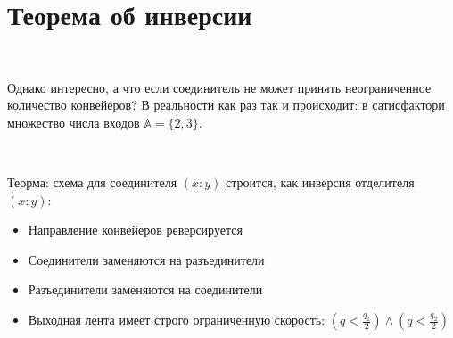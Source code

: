 \vspace{0.5in}

\section{Теорема об инверсии}

\

Однако интересно, а что если соединитель не может принять неограниченное количество конвейеров? В реальности как раз так и происходит: в сатисфактори множество числа входов $\mathbb{A} = \{ 2, 3 \}$. 

\

\noindent Теорма: схема для соединителя $(x:y)$ строится, как инверсия отделителя $(x:y)$:

\begin{itemize}
	\item Направление конвейеров реверсируется
	
	\item Соединители заменяются на разъединители
	
	\item Разъединители заменяются на соединители
	
	\item Выходная лента имеет строго ограниченную скорость: $(q < \frac{q_1}2) \land (q < \frac{q_2}2)$
\end{itemize}





\vspace{0.5in}

